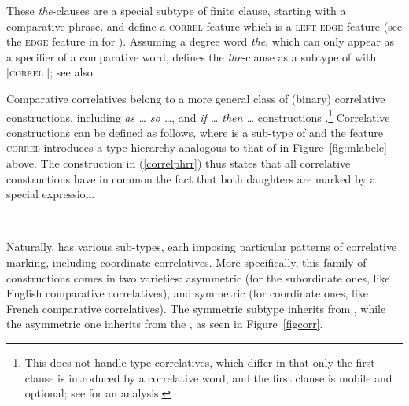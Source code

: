 {\begin{exe}
 \ex
\begin{xlista}
\end{xlista}\label{intell}
\end{exe}

These \emph{the}-clauses  are a special subtype of finite clause, starting with a comparative
phrase. \citet[]{Abeille:Borsley:Espinal:06} and \citet[]{Borsley:11} 
define a \textsc{correl} feature which is a \textsc{left edge} feature (see the \textsc{edge}
feature in \citealt{Bonami:2004} for  ). Assuming a degree word \textit{the}, which can only appear as a specifier of
a comparative word, \citet[]{Borsley:11}  defines the \textit{the}-clause as a subtype of  with [\textsc{correl} ]; see also \citet[]{fgsag08}.

Comparative correlatives belong to a more general class of (binary) correlative constructions, including \emph{as \ldots{} so \ldots{}},
and \emph{if \ldots{} then  \ldots{}} constructions  
\parencites[Section~3.2]{Borsley:04}[--18]{Borsley:11}.\footnote{This does not handle  type correlatives, which differ in that  only the first clause is introduced by a correlative word, and the first clause is mobile and optional; see \citet[228]{pollardsag} for an analysis.}
Correlative constructions can be defined as follows, 
where  is a sub-type of 
 and the feature \textsc{correl} introduces a  type
hierarchy analogous to that of  in Figure~\ref{fig:mlabelc} above.
The construction in (\ref{correlphrr}) thus states that all correlative
constructions have in common the fact that both daughters are marked by a special expression. 

\ea
\label{correlphrr}
 \impl\\
\z

Naturally,  has various sub-types, each imposing particular patterns of correlative marking, including coordinate correlatives. More specifically,  this family of constructions  comes in two varieties: asymmetric (for the subordinate ones, like English comparative correlatives), and symmetric (for coordinate ones, like French comparative correlatives). The symmetric subtype inherits from , while the asymmetric one inherits from the , as seen in Figure~\ref{figcorr}.

}
